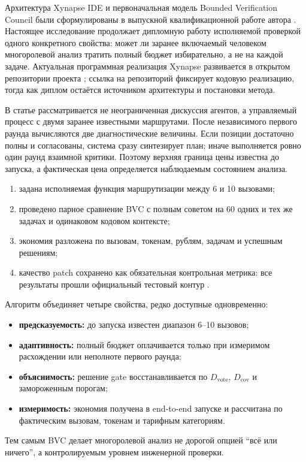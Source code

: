 \documentclass[11pt]{article}
\begin{document}
Архитектура Xynapse IDE и первоначальная модель Bounded Verification Council были
сформулированы в выпускной квалификационной работе автора
\cite{khalilov2026}. Настоящее исследование продолжает дипломную работу
исполняемой проверкой одного конкретного свойства: может ли заранее включаемый
человеком многоролевой анализ тратить полный бюджет избирательно, а не на
каждой задаче. Актуальная программная реализация Xynapse развивается в открытом
репозитории проекта \cite{xynapse2026}; ссылка на репозиторий фиксирует кодовую
реализацию, тогда как диплом остаётся источником архитектуры и постановки метода.

В статье рассматривается не неограниченная дискуссия агентов, а управляемый
процесс с двумя заранее известными маршрутами. После независимого первого
раунда вычисляются две диагностические величины. Если позиции достаточно
полны и согласованы, система сразу синтезирует план; иначе выполняется ровно
один раунд взаимной критики. Поэтому верхняя граница цены известна до запуска,
а фактическая цена определяется наблюдаемым состоянием анализа.

\begin{resultbox}
\begin{enumerate}
  \item задана исполняемая функция маршрутизации между 6 и 10 вызовами;
  \item проведено парное сравнение BVC с полным советом на 60 одних и тех же
        задачах и одинаковом кодовом контексте;
  \item экономия разложена по вызовам, токенам, рублям, задачам и успешным
        решениям;
  \item качество patch сохранено как обязательная контрольная метрика:
        все результаты прошли официальный тестовый контур \dataset{}.
\end{enumerate}
\end{resultbox}

\begin{resultbox}
Алгоритм объединяет четыре свойства, редко доступные одновременно:
\begin{itemize}
  \item \textbf{предсказуемость:} до запуска известен диапазон 6--10 вызовов;
  \item \textbf{адаптивность:} полный бюджет оплачивается только при
        измеримом расхождении или неполноте первого раунда;
  \item \textbf{объяснимость:} решение gate восстанавливается по
        \(D_{\mathrm{vote}}\), \(D_{\mathrm{cov}}\) и замороженным порогам;
  \item \textbf{измеримость:} экономия получена в end-to-end запуске и
        рассчитана по фактическим вызовам, токенам и тарифным категориям.
\end{itemize}
Тем самым BVC делает многоролевой анализ не дорогой опцией
\enquote{всё или ничего}, а контролируемым уровнем инженерной проверки.
\end{resultbox}
\end{document}
